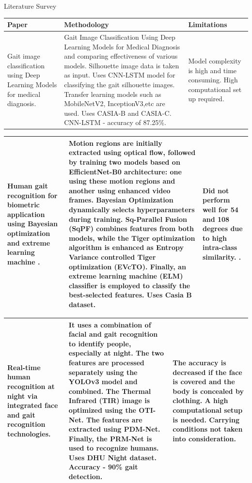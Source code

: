 \documentclass[xcolor=dvipsnames]{beamer}
\begin{document}
\begin{frame}{Literature Survey}
\begin{table}
  \centering
  
  \tiny
  \begin{tabular}{|p{3cm}|p{5cm}|p{3cm}|} 
    \hline
    Paper & Methodology & Limitations \\
    \hline
    Gait image classification using Deep Learning Models for medical diagnosis\cite{vasudevan2023}.
    & 
    Gait Image Classification Using Deep Learning Models for Medical Diagnosis and comparing effectiveness of various models. Silhouette image data is taken as input. Uses CNN-LSTM model for classifying the gait silhouette images. Transfer learning models such as MobileNetV2, InceptionV3,etc are used. Uses CASIA-B and CASIA-C. CNN-LSTM - accuracy of 87.25\%.& 
    Model complexity is high and time consuming. High computational set up required.
    \\

    \hline
  \end{tabular}


   \begin{tabular}{|p{3cm}|p{5cm}|p{3cm}|}
    Human gait recognition for biometric application using Bayesian optimization and extreme learning machine  \cite{khan2023}. &
    Motion regions are initially extracted using optical flow, followed by training two models based on EfficientNet-B0 architecture: one using these motion regions and another using enhanced video frames. Bayesian Optimization dynamically selects hyperparameters during training. Sq-Parallel Fusion (SqPF) combines features from both models, while the Tiger optimization algorithm is enhanced as Entropy Variance controlled Tiger optimization (EVcTO). Finally, an extreme learning machine (ELM) classifier is employed to classify the best-selected features. Uses Casia B dataset. &
    Did not perform well for 54 and 108 degrees due to high intra-class similarity.
.\\
    \hline
  \end{tabular}


   \begin{tabular}{|p{3cm}|p{5cm}|p{3cm}|}
    Real-time human recognition at night via integrated face and gait recognition technologies\cite{manssor2021}.&
    It uses a combination of facial and gait recognition to identify people, especially at night. The two features are processed separately using the YOLOv3 model and combined. The Thermal Infrared (TIR) image is optimized using the OTI-Net. The features are extracted using PDM-Net. Finally, the PRM-Net is used to recognize humans. Uses DHU Night dataset. Accuracy - 90\% gait detection.
  &
    The accuracy is decreased if the face is covered and the body is concealed by clothing. A high computational setup is needed. Carrying conditions not taken into consideration.\\   
    \hline
  \end{tabular}

 
  
\end{table}
\end{frame}
\end{document}
